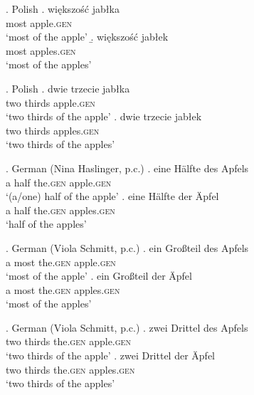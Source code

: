 \ex.\label{ex:analogy-entity-set-most-polish} Polish
\ag. większość jabłka\label{ex:analogy-entity-set-most-polish-sg}\\
most apple\textsc{.gen}\\
`most of the apple'
\b. większość jabłek\label{ex:analogy-entity-set-most-polish-pl}\\
most apples\textsc{.gen}\\
`most of the apples'

\ex.\label{ex:analogy-entity-set-fractions-polish} Polish
\ag. dwie trzecie jabłka\label{ex:analogy-entity-set-fractions-polish-sg}\\
two thirds apple\textsc{.gen}\\
`two thirds of the apple'
\bg. dwie trzecie jabłek\label{ex:analogy-entity-set-fractions-polish-pl}\\
two thirds apples\textsc{.gen}\\
`two thirds of the apples'

\ex.\label{ex:analogy-entity-set-half-german} German (Nina Haslinger, p.c.)
\ag. eine Hälfte des Apfels\label{ex:analogy-entity-set-half-german-sg}\\
a half the\textsc{.gen} apple\textsc{.gen}\\
`(a/one) half of the apple'
\bg. eine Hälfte der Äpfel\label{ex:analogy-entity-set-half-german-pl}\\
a half the\textsc{.gen} apples\textsc{.gen}\\
`half of the apples'

\ex.\label{ex:analogy-entity-set-most-german} German (Viola Schmitt, p.c.)
\ag. ein Großteil des Apfels\label{ex:analogy-entity-set-most-german-sg}\\
a most the\textsc{.gen} apple\textsc{.gen}\\
`most of the apple'
\bg. ein Großteil der Äpfel\label{ex:analogy-entity-set-most-german-pl}\\
a most the\textsc{.gen} apples\textsc{.gen}\\
`most of the apples'

\ex.\label{ex:analogy-entity-set-fractions-german} German (Viola Schmitt, p.c.)
\ag. zwei Drittel des Apfels\label{ex:analogy-entity-set-fractions-german-sg}\\
two thirds the\textsc{.gen} apple\textsc{.gen}\\
`two thirds of the apple'
\bg. zwei Drittel der Äpfel\label{ex:analogy-entity-set-fractions-german-pl}\\
two thirds the\textsc{.gen} apples\textsc{.gen}\\
`two thirds of the apples'

